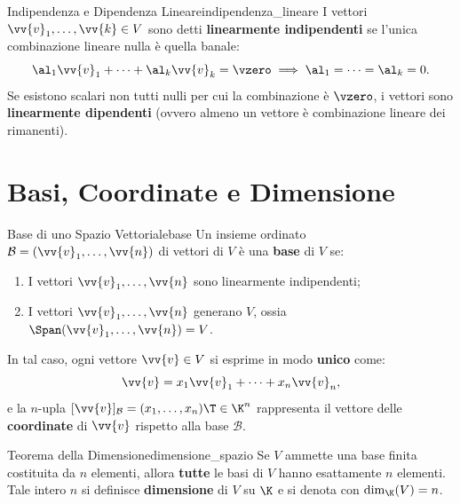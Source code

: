 \begin{definizione}{Indipendenza e Dipendenza Lineare}{indipendenza_lineare}
I vettori $\vv{v}_1, \dots, \vv{k} \in V$ sono detti \textbf{linearmente indipendenti} se l'unica combinazione lineare nulla è quella banale:
\begin{equation}
    \al_1 \vv{v}_1 + \dots + \al_k \vv{v}_k = \vzero \implies \al_1 = \dots = \al_k = 0.
\end{equation}
Se esistono scalari non tutti nulli per cui la combinazione è $\vzero$, i vettori sono \textbf{linearmente dipendenti} (ovvero almeno un vettore è combinazione lineare dei rimanenti).
\end{definizione}

\section{Basi, Coordinate e Dimensione}

\begin{definizione}{Base di uno Spazio Vettoriale}{base}
Un insieme ordinato $\mathcal{B} = (\vv{v}_1, \dots, \vv{n})$ di vettori di $V$ è una \textbf{base} di $V$ se:
\begin{enumerate}
    \item I vettori $\vv{v}_1, \dots, \vv{n}$ sono linearmente indipendenti;
    \item I vettori $\vv{v}_1, \dots, \vv{n}$ generano $V$, ossia $\Span(\vv{v}_1, \dots, \vv{n}) = V$.
\end{enumerate}
In tal caso, ogni vettore $\vv{v} \in V$ si esprime in modo \textbf{unico} come:
\begin{equation}
    \vv{v} = x_1 \vv{v}_1 + \dots + x_n \vv{v}_n,
\end{equation}
e la $n$-upla $[\vv{v}]_{\mathcal{B}} = (x_1, \dots, x_n)\T \in \K^n$ rappresenta il vettore delle \textbf{coordinate} di $\vv{v}$ rispetto alla base $\mathcal{B}$.
\end{definizione}

\begin{teorema}{Teorema della Dimensione}{dimensione_spazio}
Se $V$ ammette una base finita costituita da $n$ elementi, allora \textbf{tutte} le basi di $V$ hanno esattamente $n$ elementi. Tale intero $n$ si definisce \textbf{dimensione} di $V$ su $\K$ e si denota con $\dim_{\K}(V) = n$.
\end{teorema}


